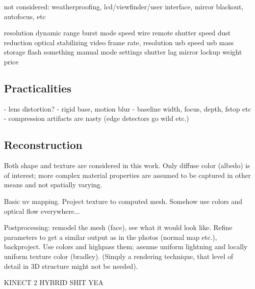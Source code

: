 not considered: weatherproofing, lcd/viewfinder/user interface, mirror blackout, autofocus, etc

resolution
dynamic range
burst mode speed
wire remote shutter speed
dust reduction
optical stabilizing
video frame rate, resolution
usb speed
usb mass storage
flash something
manual mode settings
shutter lag
mirror lockup
weight
price

\subsection{Practicalities}

- lens distortion?
- rigid base, motion blur
- baseline width, focus, depth, fstop etc
- compression artifacts are nasty (edge detectors go wild etc.)


\subsection{Reconstruction}

Both shape and texture are considered in this work. Only diffuse color (albedo) is of interest; more complex material properties are assumed to be captured in other means and not spatially varying.

Basic uv mapping. Project texture to computed mesh. Somehow use colors and optical flow everywhere...

Postprocessing: remodel the mesh (face), see what it would look like. Refine parameters to get a similar output as in the photos (normal map etc.), backproject. Use colors and highpass them; assume uniform lightning and locally uniform texture color (bradley). (Simply a rendering technique, that level of detail in 3D structure might not be needed).


KINECT 2 HYBRID SHIT YEA

